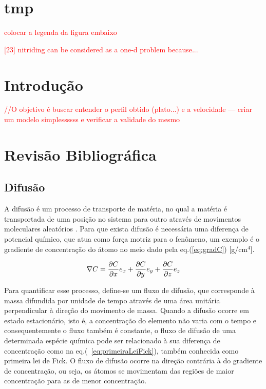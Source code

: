 \documentclass[]{politex}
\newcommand\myworries[1]{\textcolor{red}{#1}}
\begin{document}
\capa

\chapter{tmp}
\par \myworries{colocar a legenda da figura embaixo}

\myworries{[23] nitriding can be considered as a one-d problem because...
}
\listadefiguras
\listadetabelas

\sumario


\chapter{Introdução}

\myworries{//O objetivo é buscar entender o perfil obtido (plato...) e a velocidade ---
 criar um modelo simplessssss e verificar a validade do mesmo}

\chapter{Revisão Bibliográfica}
\section{Difusão}
\label{sec:difusao}
	A difusão é um processo de transporte de matéria, no qual a matéria é transportada de uma posição no sistema para outro através de movimentos moleculares aleatórios \cite{crank1979mathematics}. Para que exista difusão é necessária uma diferença de potencial químico, que atua como força motriz para o fenômeno, um exemplo é o gradiente de concentração do átomo no meio dado pela eq.(\ref{eq:gradC}) [g/cm$^4$]. 

\begin{equation} \label{eq:gradC}
\nabla C = \pdv{C}{x}e_x + \pdv{C}{y}e_y + \pdv{C}{z}e_z
\end{equation}

Para quantificar esse processo, define-se um fluxo de difusão, que corresponde à massa difundida por unidade de tempo através de uma área unitária perpendicular à direção do movimento de massa. Quando a difusão ocorre em estado estacionário, isto é, a concentração do elemento não varia com o tempo e consequentemente o fluxo também é constante, o fluxo de difusão de uma determinada espécie química pode ser relacionado à sua diferença de concentração como na eq.(~\ref{eq:primeiraLeiFick}), também conhecida como primeira lei de Fick. O fluxo de difusão ocorre na direção contrária à do gradiente de concentração, ou seja, os átomos se movimentam das regiões de maior concentração para as de menor concentração.
\end{document}
